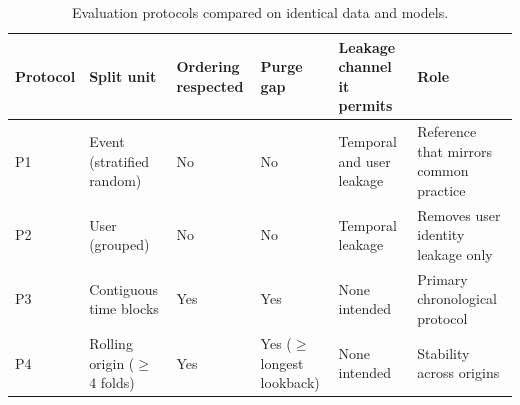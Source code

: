 \begin{table}[t]
\centering\small
\caption{Evaluation protocols compared on identical data and models.}
\begin{tabular}{lp{3.2cm}p{3.2cm}p{3.2cm}p{3.2cm}p{3.2cm}}
\toprule
Protocol & Split unit & Ordering respected & Purge gap & Leakage channel it permits & Role \\
\midrule
P1 & Event (stratified random) & No & No & Temporal and user leakage & Reference that mirrors common practice \\
P2 & User (grouped) & No & No & Temporal leakage & Removes user identity leakage only \\
P3 & Contiguous time blocks & Yes & Yes & None intended & Primary chronological protocol \\
P4 & Rolling origin ($\geq$ 4 folds) & Yes & Yes ($\geq$ longest lookback) & None intended & Stability across origins \\
\bottomrule
\end{tabular}
\label{tab:protocol_definitions}
\end{table}
